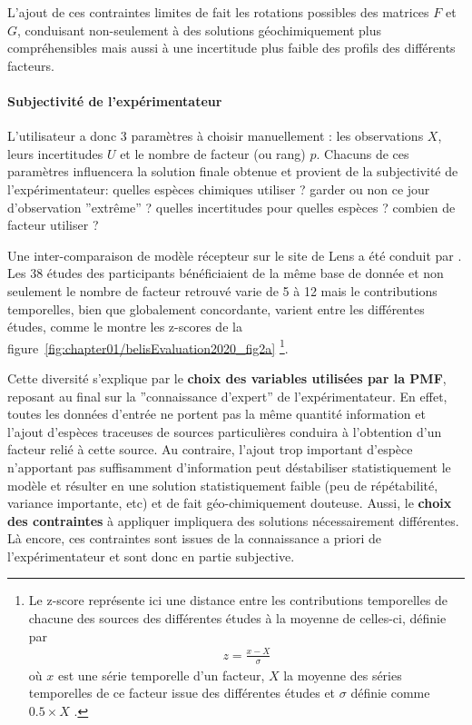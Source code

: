 L'ajout de ces contraintes limites de fait les rotations possibles des matrices $F$ et
$G$, conduisant non-seulement à des solutions géochimiquement plus compréhensibles mais
aussi à une incertitude plus faible des profils des différents facteurs.

\paragraph{Subjectivité de l'expérimentateur}%
\label{par:subjectivité_de_l_expérimentateur}

L'utilisateur a donc 3 paramètres à choisir manuellement : les observations $X$, leurs
incertitudes $U$ et le nombre de facteur (ou rang) $p$. Chacuns de ces paramètres
influencera la solution finale obtenue et provient de la subjectivité de l'expérimentateur:
quelles espèces chimiques utiliser ? garder ou non ce jour d'observation ''extrême'' ?
quelles incertitudes pour quelles espèces ? combien de facteur utiliser ?

Une inter-comparaison de modèle récepteur sur le site de Lens a été conduit par
\textcite{belisEvaluation2020}. Les 38 études des participants bénéficiaient de
la même base de donnée et non seulement le nombre de facteur retrouvé varie de 5 à 12 mais 
le contributions temporelles, bien que globalement concordante, varient entre les
différentes études, comme le montre les z-scores de la figure~\ref{fig:chapter01/belisEvaluation2020_fig2a}
\footnote{Le z-score représente ici une distance entre les contributions temporelles de
    chacune des sources des différentes études à la moyenne de celles-ci, définie par 
    \begin{align}
        \label{eq:z-score}
        z = \frac{x-X}{\sigma}
    \end{align}
    où $x$ est une série temporelle d'un facteur, $X$ la moyenne des séries temporelles de
    ce facteur issue des différentes études et $\sigma$ définie comme $0.5\times X$
    \parencite{pernigottiDeltaSA2018}.
}.

Cette diversité s'explique par le \textbf{choix des variables utilisées par la PMF}, reposant au
final sur la ''connaissance d'expert'' de l'expérimentateur. En effet, toutes les données
d'entrée ne portent pas la même quantité information et l'ajout d'espèces traceuses de
sources particulières conduira à l'obtention d'un facteur relié à cette source. Au
contraire, l'ajout trop important d'espèce n'apportant pas suffisamment d'information peut
déstabiliser statistiquement le modèle et résulter en une solution statistiquement faible
(peu de répétabilité, variance importante, etc) et de fait géo-chimiquement douteuse.
Aussi, le \textbf{choix des contraintes} à appliquer impliquera des solutions
nécessairement différentes. Là encore, ces contraintes sont issues de la connaissance a
priori de l'expérimentateur et sont donc en partie subjective.

